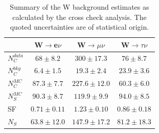 
\begin{table}[!htb]
\centering
\begin{tabular}{|l|c|c|c|}
\hline
 & W$\rightarrow$e$\nu$ & W$\rightarrow\mu\nu$ & W$\rightarrow\tau\nu$ \\
\hline\hline
$N_{C}^{data}$ & $  68 \pm 8.2$ & $300   \pm 17.3$ & $76  \pm 8.7$ \\
$N_{C}^{bkg}$  & $ 6.4 \pm 1.5$ & $19.3  \pm  2.4$ & $23.9\pm 3.6$ \\
$N_{C}^{MC}$   & $87.3 \pm 7.7$ & $227.6 \pm 12.0$ & $60.3\pm 6.0$ \\
$N_{S}^{MC}$   & $90.3 \pm 8.7$ & $119.9 \pm  9.9$ & $94.0\pm 8.5$ \\
\hline\hline               
SF             & $0.71\pm0.11$ & $1.23\pm0.10$   & $0.86\pm0.18$ \\
\hline\hline
$N_{S}$        & $63.8\pm12.0$ & $147.9\pm 17.2$ & $81.2\pm18.3$ \\
\hline
\end{tabular}
\caption{Summary of the W background estimates as calculated by the cross check analysis. The quoted uncertainties are of statistical origin.}
\label{TABLE:ParkedDataAnalysis_WBackground_Summary}
\end{table}


